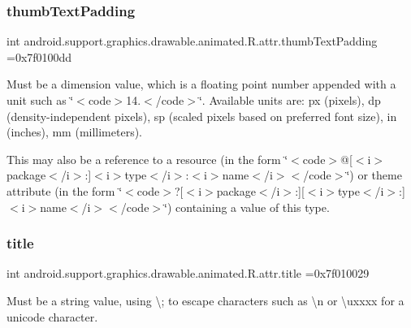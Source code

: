 \subsubsection{\texorpdfstring{thumb\+Text\+Padding}{thumbTextPadding}}
{\footnotesize\ttfamily int android.\+support.\+graphics.\+drawable.\+animated.\+R.\+attr.\+thumb\+Text\+Padding =0x7f0100dd\hspace{0.3cm}{\ttfamily [static]}}

Must be a dimension value, which is a floating point number appended with a unit such as \char`\"{}$<$code$>$14.\+5sp$<$/code$>$\char`\"{}. Available units are\+: px (pixels), dp (density-\/independent pixels), sp (scaled pixels based on preferred font size), in (inches), mm (millimeters). 

This may also be a reference to a resource (in the form \char`\"{}$<$code$>$@\mbox{[}$<$i$>$package$<$/i$>$\+:\mbox{]}$<$i$>$type$<$/i$>$\+:$<$i$>$name$<$/i$>$$<$/code$>$\char`\"{}) or theme attribute (in the form \char`\"{}$<$code$>$?\mbox{[}$<$i$>$package$<$/i$>$\+:\mbox{]}\mbox{[}$<$i$>$type$<$/i$>$\+:\mbox{]}$<$i$>$name$<$/i$>$$<$/code$>$\char`\"{}) containing a value of this type. \mbox{\label{classandroid_1_1support_1_1graphics_1_1drawable_1_1animated_1_1R_1_1attr_a29aa9767ec9815e26b0bf9db8366862e}} 
\subsubsection{\texorpdfstring{title}{title}}
{\footnotesize\ttfamily int android.\+support.\+graphics.\+drawable.\+animated.\+R.\+attr.\+title =0x7f010029\hspace{0.3cm}{\ttfamily [static]}}

Must be a string value, using \textquotesingle{}\textbackslash{};\textquotesingle{} to escape characters such as \textquotesingle{}\textbackslash{}n\textquotesingle{} or \textquotesingle{}\textbackslash{}uxxxx\textquotesingle{} for a unicode character. 

